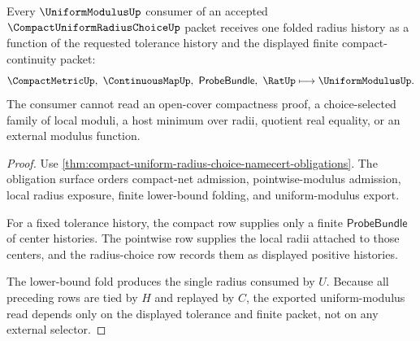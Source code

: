 \begin{theorem}
\label{thm:compact-uniform-radius-choice-tolerance-only-handoff}
Every $\UniformModulusUp$ consumer of an accepted $\CompactUniformRadiusChoiceUp$ packet receives one folded radius history as a function of the requested tolerance history and the displayed finite compact-continuity packet:
$$
\CompactMetricUp,\ \ContinuousMapUp,\ \mathsf{ProbeBundle},\ \RatUp
\longmapsto
\UniformModulusUp .
$$
The consumer cannot read an open-cover compactness proof, a choice-selected family of local moduli, a host minimum over radii, quotient real equality, or an external modulus function.
\end{theorem}
\begin{proof}
Use \autoref{thm:compact-uniform-radius-choice-namecert-obligations}. The obligation surface orders compact-net admission, pointwise-modulus admission, local radius exposure, finite lower-bound folding, and uniform-modulus export.

For a fixed tolerance history, the compact row supplies only a finite $\mathsf{ProbeBundle}$ of center histories. The pointwise row supplies the local radii attached to those centers, and the radius-choice row records them as displayed positive histories.

The lower-bound fold produces the single radius consumed by $U$. Because all preceding rows are tied by $H$ and replayed by $C$, the exported uniform-modulus read depends only on the displayed tolerance and finite packet, not on any external selector.
\end{proof}


\begin{closurestatus}{\CompactUniformRadiusChoiceUp}
  \theoryclosure{\seedClosure}
  \formalstatus{\unformalizedV}
\end{closurestatus}
